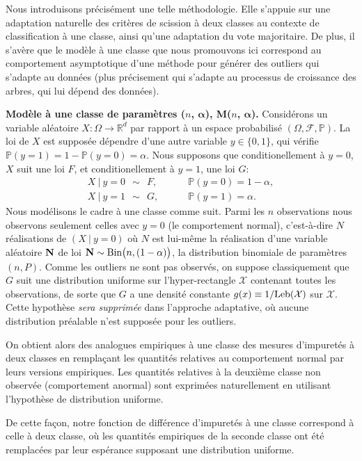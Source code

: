 Nous introduisons précisément une telle méthodologie. Elle s'appuie sur une adaptation naturelle des critères de scission à deux classes au contexte de classification à une classe, ainsi qu'une adaptation du vote majoritaire. De plus, il s'avère que le modèle à une classe que nous promouvons ici correspond au comportement asymptotique d'une méthode pour générer des outliers qui s'adapte au données (plus précisement qui s'adapte au processus de croissance des arbres, qui lui dépend des données).

\textbf{Modèle à une classe de paramètres ($n$, $\boldsymbol{\alpha}$), M($n$, $\boldsymbol{\alpha}$).}
Considérons un variable aléatoire $ X:\Omega \to \mathbb{R}^d$ par rapport à un espace probabilisé $(\Omega, \mathcal{F}, \mathbb{P})$.
La loi de $X$ est supposée dépendre d'une autre variable $y \in \{0,1\}$, qui vérifie $\mathbb{P}(y=1)=1-\mathbb{P}(y=0)=\alpha$. Nous supposons que conditionellement à $y=0$, $X$ suit une loi $F$, et conditionellement à $y=1$, une loi $G$:
\begin{align*}
 X ~|~ y=0 ~~\sim~~ F, &~~~~~~~~~~  \mathbb{P}(y=0)=1-\alpha, \\
 X ~|~ y=1 ~~\sim~~ G, &~~~~~~~~~~  \mathbb{P}(y=1)=\alpha.
\end{align*}
%
Nous modélisons le cadre à une classe comme suit. Parmi les $n$ observations \iid nous observons seulement celles avec $y = 0$ (le comportement normal), c'est-à-dire $N$ réalisations de $ (X ~ | ~ y = 0)$ où $N$ est lui-même la réalisation d'une variable aléatoire $\mathbf N$ de loi $\mathbf N \sim \text{Bin}\big(n, (1-\alpha)\big)$, la distribution binomiale de paramètres $ (n, P)$. Comme les outliers ne sont pas observés, on suppose classiquement que $G$ suit une distribution uniforme sur l'hyper-rectangle $ \mathcal{X} $ contenant toutes les observations, de sorte que $ G $ a une densité constante $g(x) \equiv 1 / \text{Leb}(\mathcal{X})$ sur $\mathcal{X}$. Cette hypothèse \emph{sera supprimée} dans l'approche adaptative, où aucune distribution préalable n'est supposée pour les outliers.

On obtient alors des analogues empiriques à une classe des mesures d'impuretés à deux classes en remplaçant les quantités relatives au comportement normal par leurs versions empiriques. Les quantités relatives à la deuxième classe non observée (comportement anormal) sont exprimées naturellement en utilisant l'hypothèse de distribution uniforme.

De cette façon, notre fonction de différence d'impuretés à une classe correspond à celle à deux classe, où les quantités empiriques de la seconde classe ont été remplacées par leur espérance supposant une distribution uniforme.

